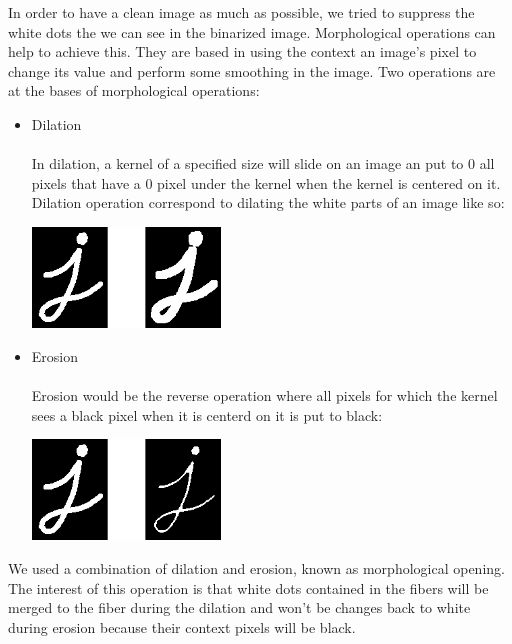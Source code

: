 \documentclass{report}
\begin{document}
In order to have a clean image as much as possible, we tried to suppress the white dots the we can see in the binarized image.
Morphological operations can help to achieve this. They are based in using the context an image's pixel to change its value and perform some smoothing in the image.
Two operations are at the bases of morphological operations:
\begin{itemize}

\item{Dilation}\\\\
In dilation, a kernel of a specified size will slide on an image an put to 0 all pixels that have a 0 pixel under the kernel when the kernel is centered on it. Dilation operation correspond to dilating the white parts of an image like so:

\begin{minipage}{\linewidth}
	\centering
	\includegraphics[width=5cm]{figures/Thibault/Morphology_1_Tutorial_Theory_Dilatation_2.png}
\end{minipage}

\item{Erosion}\\\\
Erosion would be the reverse operation where all pixels for which the kernel sees a black pixel when it is centerd on it is put to black:

\begin{minipage}{\linewidth}
	\centering
	\includegraphics[width=5cm]{figures/Thibault/Morphology_1_Tutorial_Theory_Erosion_2.png}
\end{minipage}

\end{itemize}


We used a combination of dilation and erosion, known as morphological opening. The interest of this operation is that white dots
contained in the fibers will be merged to the fiber during the dilation and won't be changes back to white during erosion because
their context pixels will be black.
\end{document}
